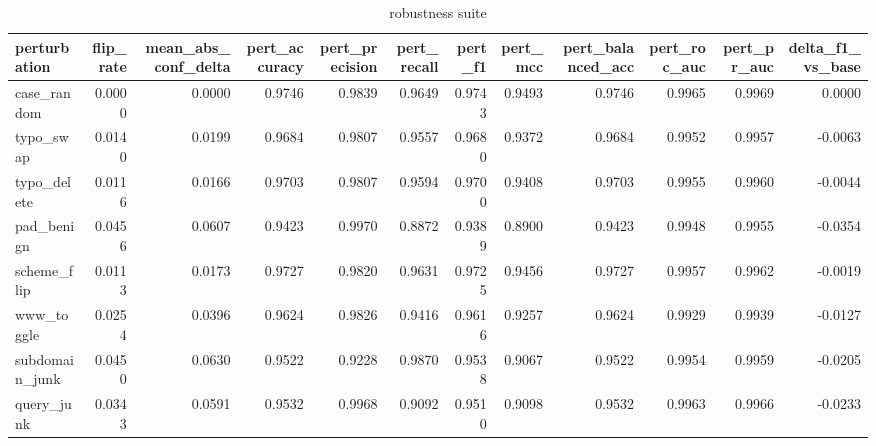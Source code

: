 \begin{table}[htbp]
\caption{robustness suite}
\label{tab:robustness_suite}
\begin{tabular}{lrrrrrrrrrrr}
\toprule
perturbation & flip_rate & mean_abs_conf_delta & pert_accuracy & pert_precision & pert_recall & pert_f1 & pert_mcc & pert_balanced_acc & pert_roc_auc & pert_pr_auc & delta_f1_vs_base \\
\midrule
case\_random & 0.0000 & 0.0000 & 0.9746 & 0.9839 & 0.9649 & 0.9743 & 0.9493 & 0.9746 & 0.9965 & 0.9969 & 0.0000 \\
typo\_swap & 0.0140 & 0.0199 & 0.9684 & 0.9807 & 0.9557 & 0.9680 & 0.9372 & 0.9684 & 0.9952 & 0.9957 & -0.0063 \\
typo\_delete & 0.0116 & 0.0166 & 0.9703 & 0.9807 & 0.9594 & 0.9700 & 0.9408 & 0.9703 & 0.9955 & 0.9960 & -0.0044 \\
pad\_benign & 0.0456 & 0.0607 & 0.9423 & 0.9970 & 0.8872 & 0.9389 & 0.8900 & 0.9423 & 0.9948 & 0.9955 & -0.0354 \\
scheme\_flip & 0.0113 & 0.0173 & 0.9727 & 0.9820 & 0.9631 & 0.9725 & 0.9456 & 0.9727 & 0.9957 & 0.9962 & -0.0019 \\
www\_toggle & 0.0254 & 0.0396 & 0.9624 & 0.9826 & 0.9416 & 0.9616 & 0.9257 & 0.9624 & 0.9929 & 0.9939 & -0.0127 \\
subdomain\_junk & 0.0450 & 0.0630 & 0.9522 & 0.9228 & 0.9870 & 0.9538 & 0.9067 & 0.9522 & 0.9954 & 0.9959 & -0.0205 \\
query\_junk & 0.0343 & 0.0591 & 0.9532 & 0.9968 & 0.9092 & 0.9510 & 0.9098 & 0.9532 & 0.9963 & 0.9966 & -0.0233 \\
\bottomrule
\end{tabular}
\end{table}
